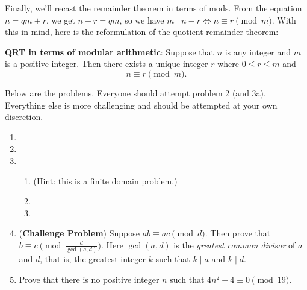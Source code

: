 Finally, we'll recast the remainder theorem in terms of mods. From the equation $n = qm + r$, we get $n - r = qm$, so we have $m \mid n - r \iff n \equiv r \pmod{m}$. With this in mind, here is the reformulation of the quotient remainder theorem:

\begin{tcolorbox}
 \textbf{QRT in terms of modular arithmetic}: Suppose that $n$ is any integer and $m$ is a positive integer. Then there exists a unique integer $r$ where $0 \leq r \leq m$ and 
 \[n \equiv r \pmod{m}.\]
\end{tcolorbox}

Below are the problems. Everyone should attempt problem 2 (and 3a). Everything else is more challenging and should be attempted at your own discretion.

 \begin{enumerate}
   \item 
   \item 
   \item
   \begin{enumerate}
       \item  (Hint: this is a finite domain problem.)
       \item 
       \item 
   \end{enumerate}
   \item (\textbf{Challenge Problem}) Suppose $ab \equiv ac \pmod{d}$. Then prove that $b \equiv c \pmod{\frac{d}{\gcd(a, d)}}$. Here $\gcd(a, d)$ is the \textit{greatest common divisor} of $a$ and $d$, that is, the greatest integer $k$ such that $k \mid a$ and $k \mid d$.
   \item Prove that there is no positive integer $n$ such that $4n^2 - 4 \equiv 0 \pmod{19}$.
 \end{enumerate}